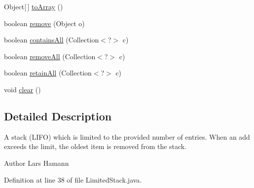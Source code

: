 \begin{DoxyCompactItemize}
Object\mbox{[}$\,$\mbox{]} \hyperlink{classorg_1_1tzi_1_1use_1_1util_1_1collections_1_1_limited_stack_3_01_e_01_4_a15f392e3f7e4ce3d77cd3571aefa3e25}{to\-Array} ()
\item 
boolean \hyperlink{classorg_1_1tzi_1_1use_1_1util_1_1collections_1_1_limited_stack_3_01_e_01_4_a48834b3315bbb153e3f595072fcd157b}{remove} (Object o)
\item 
boolean \hyperlink{classorg_1_1tzi_1_1use_1_1util_1_1collections_1_1_limited_stack_3_01_e_01_4_aad57d5da6a6a3ac4a41fb045eb3f1fc2}{contains\-All} (Collection$<$?$>$ c)
\item 
boolean \hyperlink{classorg_1_1tzi_1_1use_1_1util_1_1collections_1_1_limited_stack_3_01_e_01_4_aae8fd056cec999892bf01aef35965c2e}{remove\-All} (Collection$<$?$>$ c)
\item 
boolean \hyperlink{classorg_1_1tzi_1_1use_1_1util_1_1collections_1_1_limited_stack_3_01_e_01_4_a59eb4d3c58aa0941989c5f94ef5fc1f6}{retain\-All} (Collection$<$?$>$ c)
\item 
void \hyperlink{classorg_1_1tzi_1_1use_1_1util_1_1collections_1_1_limited_stack_3_01_e_01_4_a246c697ee8d87e209641059b6c15b69f}{clear} ()
\end{DoxyCompactItemize}


\subsection{Detailed Description}
A stack (L\-I\-F\-O) which is limited to the provided number of entries. When an add exceeds the limit, the oldest item is removed from the stack.

\begin{DoxyAuthor}{Author}
Lars Hamann 
\end{DoxyAuthor}


Definition at line 38 of file Limited\-Stack.\-java.




